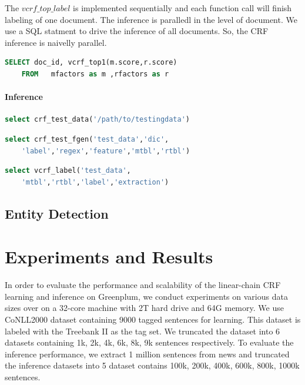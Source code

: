 \documentclass[11pt,letterpaper]{article}
\begin{document}
The $vcrf\_top\_label$ is implemented sequentially and each function call will finish labeling of one document. 
The inference is paralledl in the level of document. We use a SQL statment to drive the inference of all documents.
So, the CRF inference is naivelly parallel. 
\begin{lstlisting}[language=SQL,gobble=4]
    SELECT doc_id, vcrf_top1(m.score,r.score)
    FROM   mfactors as m ,rfactors as r
\end{lstlisting}

\paragraph{Inference}
\begin{lstlisting}[language=SQL,gobble=4]
    select crf_test_data('/path/to/testingdata')
\end{lstlisting}

\begin{lstlisting}[language=SQL,gobble=4]
    select crf_test_fgen('test_data','dic',
    'label','regex','feature','mtbl','rtbl')
\end{lstlisting}

\begin{lstlisting}[language=SQL,gobble=4]
    select vcrf_label('test_data', 
    'mtbl','rtbl','label','extraction')
\end{lstlisting}

\cite{DBLP:conf/icml/LaffertyMP01}
\cite{DBLP:journals/scholarpedia/Viterbi09}
\cite{DBLP:journals/siamjo/MoralesN00}
\cite{DBLP:journals/coling/DeRose88}
\cite{DBLP:conf/naacl/ShaP03}
\cite{DBLP:journals/coling/MarcusSM94}



\subsection{Entity Detection}

\section{Experiments and Results}
In order to evaluate the performance and scalability of the linear-chain CRF learning and inference on Greenplum,
we conduct experiments on various data sizes over on a 32-core machine with 2T hard drive and 64G memory.
We use CoNLL2000 dataset containing 9000 tagged sentences for learning. This dataset is labeled with the Treebank II
as the tag set. We truncated the dataset into 6 datasets containing 1k, 2k, 4k, 6k, 8k, 9k sentences respectively.
To evaluate the inference performance, we extract 1 million sentences from news and truncated the inference datasets into 5 dataset contains 100k, 200k, 400k, 600k, 800k, 1000k sentences.
\end{document}
